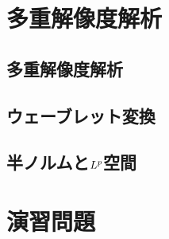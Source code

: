 \documentclass[../../main]{subfiles}
\begin{document}
\section{多重解像度解析}
\subsection{多重解像度解析}
\subsection{ウェーブレット変換}

\begin{subappendices}
\section{半ノルムと\texorpdfstring{\(L^p\)}{Lp}空間}
\end{subappendices}

\section*{演習問題}
\end{document}

